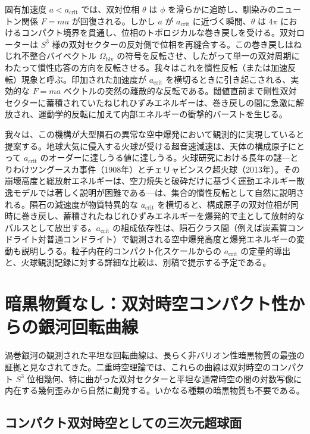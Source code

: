 \documentclass[a4paper]{article}
\begin{document}
固有加速度 $a < a_\text{crit}$ では、双対位相 $\theta$ は $\phi$ を滑らかに追跡し、馴染みのニュートン関係 $F = ma$ が回復される。しかし $a$ が $a_\text{crit}$ に近づく瞬間、$\theta$ は $4\pi$ におけるコンパクト境界を貫通し、位相のトポロジカルな巻き戻しを受ける。双対ローターは $S^3$ 様の双対セクターの反対側で位相を再縫合する。この巻き戻しはねじれ不整合バイベクトル $\Omega_\text{biv}$ の符号を反転させ、したがって単一の双対周期にわたって慣性応答の方向を反転させる。我々はこれを慣性反転（または加速反転）現象と呼ぶ。印加された加速度が $a_\text{crit}$ を横切るときに引き起こされる、実効的な $F = ma$ ベクトルの突然の離散的な反転である。閾値直前まで剛性双対セクターに蓄積されていたねじれひずみエネルギーは、巻き戻しの間に急激に解放され、運動学的反転に加えて内部エネルギーの衝撃的バーストを生じる。

我々は、この機構が大型隕石の異常な空中爆発において観測的に実現していると提案する。地球大気に侵入する火球が受ける超音速減速は、天体の構成原子にとって $a_\text{crit}$ のオーダーに達しうる値に達しうる。火球研究における長年の謎---とりわけツングースカ事件（1908年）とチェリャビンスク超火球（2013年）。その崩壊高度と総放射エネルギーは、空力焼失と破砕だけに基づく運動エネルギー散逸モデルでは著しく説明が困難である---は、集合的慣性反転として自然に説明される。隕石の減速度が物質特異的な $a_\text{crit}$ を横切ると、構成原子の双対位相が同時に巻き戻し、蓄積されたねじれひずみエネルギーを爆発的で主として放射的なパルスとして放出する。$a_\text{crit}$ の組成依存性は、隕石クラス間（例えば炭素質コンドライト対普通コンドライト）で観測される空中爆発高度と爆発エネルギーの変動も説明しうる。粒子内在的コンパクト化スケールからの $a_\text{crit}$ の定量的導出と、火球観測記録に対する詳細な比較は、別稿で提示する予定である。

\section{暗黒物質なし：双対時空コンパクト性からの銀河回転曲線}
\label{sec:darkmatter}

渦巻銀河の観測された平坦な回転曲線は、長らく非バリオン性暗黒物質の最強の証拠と見なされてきた。二重時空理論では、これらの曲線は双対時空のコンパクト $S^3$ 位相幾何、特に曲がった双対セクターと平坦な通常時空の間の対数写像に内在する幾何歪みから自然に創発する。いかなる種類の暗黒物質も不要である。

\subsection{コンパクト双対時空としての三次元超球面}
\end{document}
